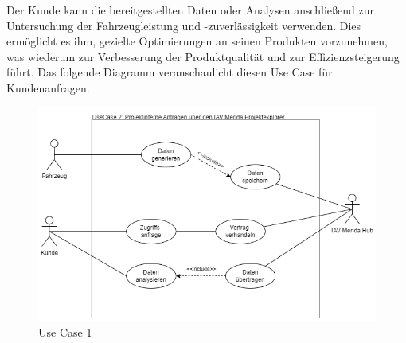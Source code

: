 Der Kunde kann die bereitgestellten Daten oder Analysen anschließend zur Untersuchung der Fahrzeugleistung und -zuverlässigkeit verwenden. Dies ermöglicht es ihm, gezielte Optimierungen an seinen Produkten vorzunehmen, was wiederum zur Verbesserung der Produktqualität und zur Effizienzsteigerung führt.
\newline
Das folgende Diagramm veranschaulicht diesen Use Case für Kundenanfragen.
\begin{figure}[H]
    \centering
    \includegraphics[scale=.6]{media/UseCase2}
    \caption{Use Case 1}
    \label{fig:UseCase2}
\end{figure}
\newpage
